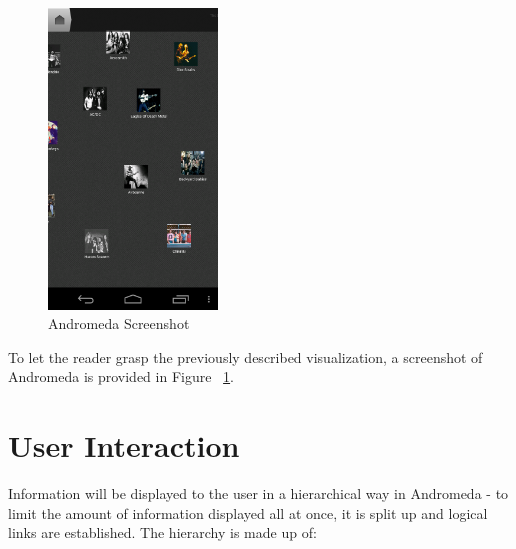 \begin{figure}[H]
  \centering
    \includegraphics[width=0.4\textwidth]{figures/screen_mds_10_after_all_uncollided_nodes}
  \caption{Andromeda Screenshot}
  \label{fig:prototype_screenshot}
\end{figure}

To let the reader grasp the previously described visualization, a screenshot of Andromeda is provided in Figure ~\ref{fig:prototype_screenshot}.

\section{User Interaction}

Information will be displayed to the user in a hierarchical way in Andromeda - to limit the amount of information displayed all at once, it is split up and logical links are established. The hierarchy is made up of:

